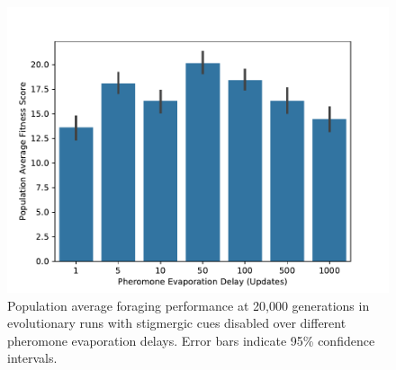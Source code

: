 \begin{figure}[!htbp]
\begin{center}
\includegraphics[width=\textwidth]{img/pheromone_evaporation_delay_average_fitness.pdf}
\caption{
Population average foraging performance at 20,000 generations in evolutionary runs with stigmergic cues disabled over different pheromone evaporation delays.
Error bars indicate 95\% confidence intervals.
}
\label{fig:pheromone_evaporation_delay_average_fitness}
\end{center}
\end{figure}
